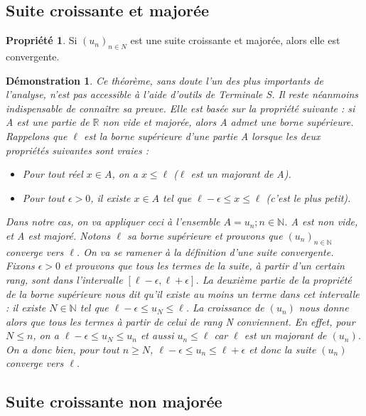 \documentclass[a4paper,12pt,final]{article}
\newtheorem{Proof}{Démonstration}[section]
\theoremstyle{theorem}
\theoremstyle{definition}
\newtheorem{Propriete}{Propriété}[section]
\theoremstyle{definition}
\theoremstyle{definition}
\begin{document}
	\subsection{Suite croissante et majorée}
	
\begin{Propriete}
	Si $(u_{n})_{n \in N}$ est une suite croissante et majorée, alors elle est convergente. 
\end{Propriete}

\begin{Proof}
	Ce théorème, sans doute l'un des plus importants de l'analyse, n'est pas accessible à l'aide d'outils de Terminale S. Il reste néanmoins indispensable de connaître sa preuve. Elle est basée sur la propriété suivante : si A est une partie de $\mathbb{R}$ non vide et majorée, alors A admet une borne supérieure. Rappelons que $\ell$ est la borne supérieure d'une partie A lorsque les deux propriétés suivantes sont vraies : \\
	\begin{itemize}
		\item Pour tout réel $x \in A$, on a $x \leq \ell$ ($\ell$
		est un majorant de A).
		\item Pour tout $\epsilon>0$, il existe $x \in A$ tel que $\ell−\epsilon \leq x \leq \ell$ (c'est le plus petit). 
	\end{itemize}
	
	Dans notre cas, on va appliquer ceci à l'ensemble $A={u_{n}; n \in \mathbb{N}}$. A est non vide, et A est majoré. Notons $\ell$ sa borne supérieure et prouvons que $(u_{n})_{n \in \mathbb{N}}$ converge vers $\ell$. On va se ramener à la définition d'une suite convergente. Fixons $\epsilon>0$ et prouvons que tous les termes de la suite, à partir d'un certain rang, sont dans l'intervalle $[\ell−\epsilon,\ell+\epsilon]$. La deuxième partie de la propriété de la borne supérieure nous dit qu'il existe au moins un terme dans cet intervalle : il existe $N \in \mathbb{N}$ tel que $\ell−\epsilon \leq u_{N} \leq \ell$. La croissance de $(u_{n})$ nous donne alors que tous les termes à partir de celui de rang N conviennent. En effet, pour $N \leq n$, on a $\ell−\epsilon \leq u_{N} \leq u_{n}$ et aussi $u_{n} \leq \ell$ car $\ell$ est un majorant de $(u_{n})$. On a donc bien, pour tout $n\geq N$, $\ell−\epsilon \leq u_{n} \leq \ell+\epsilon$ et donc la suite $(u_{n})$ converge vers $\ell$.
\end{Proof}


	\subsection{Suite croissante non majorée}
	
\end{document}
